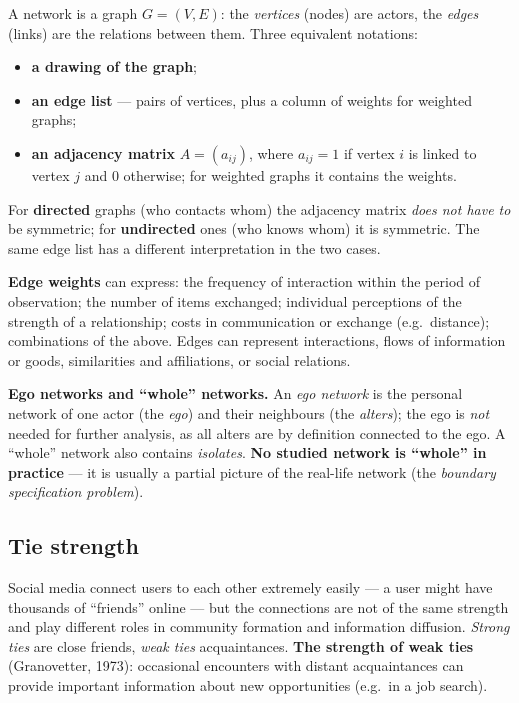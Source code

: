 \documentclass[11pt,a4paper]{article}
\theoremstyle{definition}
\providecommand{\uv}[1]{``#1''}
\begin{document}
\begin{defbox}
A network is a graph $G=(V,E)$: the \emph{vertices} (nodes) are actors, the \emph{edges} (links) are
the relations between them. Three equivalent notations:
\begin{itemize}
\item \textbf{a drawing of the graph};
\item \textbf{an edge list} --- pairs of vertices, plus a column of weights for weighted graphs;
\item \textbf{an adjacency matrix} $A=(a_{ij})$, where $a_{ij}=1$ if vertex $i$ is linked to vertex
      $j$ and 0 otherwise; for weighted graphs it contains the weights.
\end{itemize}
For \textbf{directed} graphs (who contacts whom) the adjacency matrix \emph{does not have to} be
symmetric; for \textbf{undirected} ones (who knows whom) it is symmetric. The same edge list has a
different interpretation in the two cases.
\end{defbox}

\textbf{Edge weights} can express: the frequency of interaction within the period of observation;
the number of items exchanged; individual perceptions of the strength of a relationship; costs in
communication or exchange (e.g.\ distance); combinations of the above. Edges can represent
interactions, flows of information or goods, similarities and affiliations, or social relations.

\textbf{Ego networks and \uv{whole} networks.} An \emph{ego network} is the personal network of one
actor (the \emph{ego}) and their neighbours (the \emph{alters}); the ego is \emph{not} needed for
further analysis, as all alters are by definition connected to the ego. A \uv{whole} network also
contains \emph{isolates}. \textbf{No studied network is \uv{whole} in practice} --- it is usually a
partial picture of the real-life network (the \emph{boundary specification problem}).

\subsection{Tie strength}

Social media connect users to each other extremely easily --- a user might have thousands of
\uv{friends} online --- but the connections are not of the same strength and play different roles in
community formation and information diffusion. \emph{Strong ties} are close friends, \emph{weak
ties} acquaintances. \textbf{The strength of weak ties} (Granovetter, 1973): occasional encounters
with distant acquaintances can provide important information about new opportunities (e.g.\ in a job
search).
\end{document}

